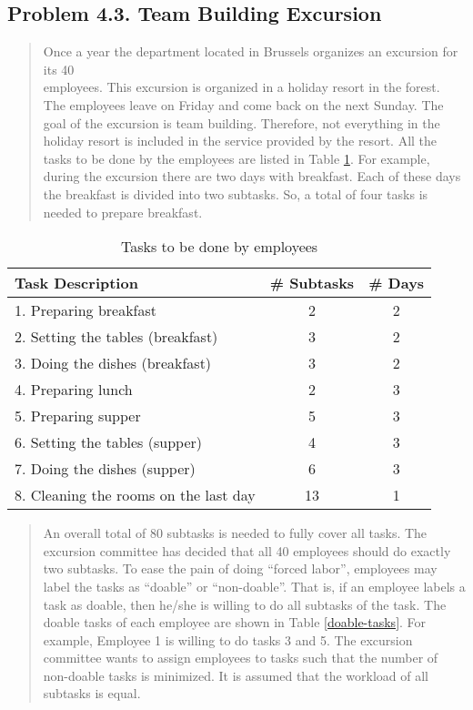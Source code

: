 \subsection{Problem 4.3. Team Building Excursion}

\begin{quote}Once a year the department located in Brussels organizes an excursion for its 40 \\ 
employees. This excursion is organized in a holiday resort in the forest. The employees
leave on Friday and come back on the next Sunday. The goal of the excursion
is team building. Therefore, not everything in the holiday resort is included in the
service provided by the resort. All the tasks to be done by the employees are listed in
Table \ref{tasks}. For example, during the excursion there are two days with breakfast. Each
of these days the breakfast is divided into two subtasks. So, a total of four tasks is
needed to prepare breakfast.\end{quote}

\begin{table}[H]
	\centering
	\caption{Tasks to be done by employees}
	\begin{tabular}{lcc}\hline
Task Description & \# Subtasks & \# Days \\ \hline
1. Preparing breakfast & 2 & 2\\
2. Setting the tables (breakfast) & 3 & 2\\
3. Doing the dishes (breakfast) & 3 & 2\\
4. Preparing lunch & 2 & 3\\
5. Preparing supper & 5 & 3\\
6. Setting the tables (supper) & 4 & 3\\
7. Doing the dishes (supper) & 6 & 3\\
8. Cleaning the rooms on the last day & 13 & 1\\ \hline
	\end{tabular}
	\label{tasks}
\end{table}

\begin{quote}
An overall total of 80 subtasks is needed to fully cover all tasks. The excursion
committee has decided that all 40 employees should do exactly two subtasks.
To ease the pain of doing ``forced labor'', employees may label the tasks as
``doable'' or ``non-doable''. That is, if an employee labels a task as doable, then he/she
is willing to do all subtasks of the task. The doable tasks of each employee are shown
in Table \ref{doable-tasks}. For example, Employee 1 is willing to do tasks 3 and 5. The excursion
committee wants to assign employees to tasks such that the number of non-doable
tasks is minimized. It is assumed that the workload of all subtasks is equal.
\end{quote}

